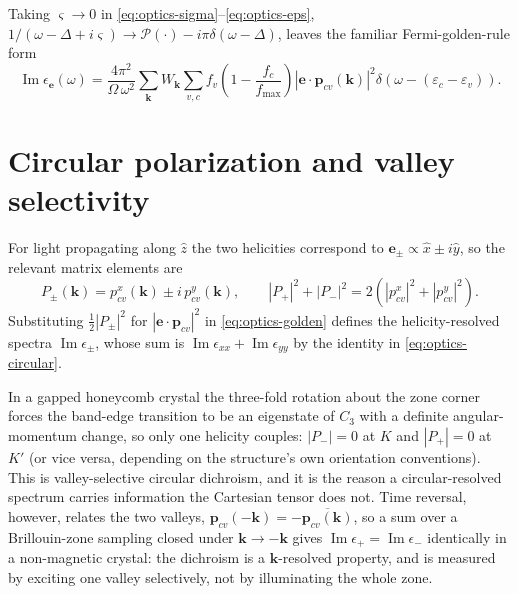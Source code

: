 \documentclass[11pt]{article}
\begin{document}
Taking $\varsigma\to0$ in \eqref{eq:optics-sigma}--\eqref{eq:optics-eps},
$1/(\omega-\Delta+i\varsigma)\to\mathcal P(\cdot)-i\pi\delta(\omega-\Delta)$,
leaves the familiar Fermi-golden-rule form
%
\begin{equation}
  \operatorname{Im}\epsilon_{\mathbf e}(\omega)=
  \frac{4\pi^2}{\Omega\,\omega^2}\sum_{\mathbf k}W_{\mathbf k}
  \sum_{v,c} f_v\!\left(1-\frac{f_c}{f_{\max}}\right)
  \left|\mathbf e\cdot\mathbf p_{cv}(\mathbf k)\right|^2
  \delta\!\left(\omega-(\varepsilon_c-\varepsilon_v)\right).
  \label{eq:optics-golden}
\end{equation}

\section{Circular polarization and valley selectivity}

For light propagating along $\hat z$ the two helicities correspond to
$\mathbf e_\pm\propto\hat x\pm i\hat y$, so the relevant matrix elements are
%
\begin{equation}
  P_\pm(\mathbf k)=p^x_{cv}(\mathbf k)\pm i\,p^y_{cv}(\mathbf k),
  \qquad
  \left|P_+\right|^2+\left|P_-\right|^2
  =2\left(\left|p^x_{cv}\right|^2+\left|p^y_{cv}\right|^2\right).
  \label{eq:optics-circular}
\end{equation}
%
Substituting $\tfrac12|P_\pm|^2$ for $|\mathbf e\cdot\mathbf p_{cv}|^2$ in
\eqref{eq:optics-golden} defines the helicity-resolved spectra
$\operatorname{Im}\epsilon_\pm$, whose sum is
$\operatorname{Im}\epsilon_{xx}+\operatorname{Im}\epsilon_{yy}$ by the
identity in \eqref{eq:optics-circular}.

In a gapped honeycomb crystal the three-fold rotation about the zone corner
forces the band-edge transition to be an eigenstate of $C_3$ with a definite
angular-momentum change, so only one helicity couples: $|P_-|=0$ at $K$ and
$|P_+|=0$ at $K'$ (or vice versa, depending on the structure's own
orientation conventions). This is valley-selective circular dichroism, and it
is the reason a circular-resolved spectrum carries information the Cartesian
tensor does not. Time reversal, however, relates the two valleys,
$\mathbf p_{cv}(-\mathbf k)=-\overline{\mathbf p_{cv}(\mathbf k)}$, so a sum
over a Brillouin-zone sampling closed under $\mathbf k\to-\mathbf k$ gives
$\operatorname{Im}\epsilon_+=\operatorname{Im}\epsilon_-$ identically in a
non-magnetic crystal: the dichroism is a $\mathbf k$-resolved property, and
is measured by exciting one valley selectively, not by illuminating the whole
zone.
\end{document}
